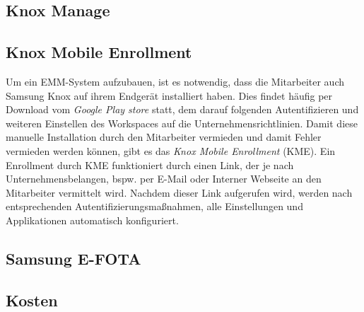 \subsection{Knox Manage}


\subsection{Knox Mobile Enrollment}
Um ein EMM-System aufzubauen, ist es notwendig, dass die Mitarbeiter auch Samsung Knox auf ihrem Endgerät installiert haben. Dies findet häufig per Download vom \textit{Google Play store} statt, dem darauf folgenden Autentifizieren und weiteren Einstellen des Workspaces auf die Unternehmensrichtlinien. 
Damit diese manuelle Installation durch den Mitarbeiter vermieden und damit Fehler vermieden werden können, gibt es das \textit{Knox Mobile Enrollment} (KME). Ein Enrollment durch KME funktioniert durch einen Link, der je nach Unternehmensbelangen, bspw. per E-Mail oder Interner Webseite an den Mitarbeiter vermittelt wird. Nachdem dieser Link aufgerufen wird, werden nach entsprechenden Autentifizierungsmaßnahmen, alle Einstellungen und Applikationen automatisch konfiguriert.

\subsection{Samsung E-FOTA}

\subsection{Kosten}






















